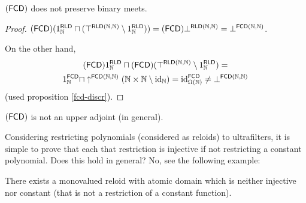\begin{example}
$(\mathsf{FCD})$ does not preserve binary meets.\end{example}
\begin{proof}
$(\mathsf{FCD})(1_{\mathbb{N}}^{\mathsf{RLD}}\sqcap(\top^{\mathsf{RLD}(\mathbb{N},\mathbb{N})}\setminus1_{\mathbb{N}}^{\mathsf{RLD}}))=(\mathsf{FCD})\bot^{\mathsf{RLD}(\mathbb{N},\mathbb{N})}=\bot^{\mathsf{FCD}(\mathbb{N},\mathbb{N})}$.

On the other hand,
\begin{multline*}
(\mathsf{FCD})1_{\mathbb{N}}^{\mathsf{RLD}}\sqcap(\mathsf{FCD})(\top^{\mathsf{RLD}(\mathbb{N},\mathbb{N})}\setminus1_{\mathbb{N}}^{\mathsf{RLD}})=\\
1_{\mathbb{N}}^{\mathsf{FCD}}\sqcap\uparrow^{\mathsf{FCD}(\mathbb{N},\mathbb{N})}(\mathbb{N}\times\mathbb{N}\setminus\operatorname{id}_{\mathbb{N}})=\operatorname{id}_{\Omega(\mathbb{N})}^{\mathsf{FCD}}\ne\bot^{\mathsf{FCD}(\mathbb{N},\mathbb{N})}
\end{multline*}
(used proposition \ref{fcd-discr}).\end{proof}
\begin{cor}
$(\mathsf{FCD})$ is not an upper adjoint (in general).
\end{cor}
Considering restricting polynomials (considered as reloids) to ultrafilters,
it is simple to prove that each that restriction is injective if not
restricting a constant polynomial. Does this hold in general? No,
see the following example:
\begin{example}
There exists a monovalued reloid with atomic domain which is neither
injective nor constant (that is not a restriction of a constant function).\end{example}
